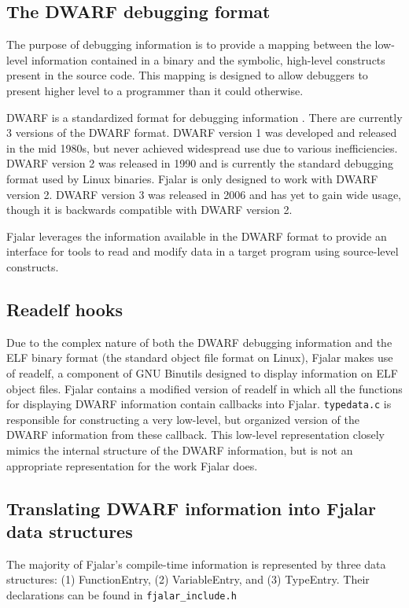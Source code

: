 \documentclass[11pt]{article}
\begin{document}
\subsection{The DWARF debugging format}
The purpose of debugging information is to provide a mapping between
the low-level information contained in a binary and the symbolic,
high-level constructs present in the source code. This mapping is
designed to allow debuggers to present higher level to a programmer
than it could otherwise.

DWARF is a standardized format for debugging information
\cite{silverstein1993dwarf}. There are currently 3 versions of the
DWARF format. DWARF version 1 was developed and released in the mid
1980s, but never achieved widespread use due to various inefficiencies. DWARF
version 2 was released in 1990 and is currently the standard debugging
format used by Linux binaries. Fjalar is only designed to work with
DWARF version 2. DWARF version 3 was released in 2006 and has yet to
gain wide usage, though it is backwards compatible with DWARF version 2.

Fjalar leverages the information available in the DWARF format to
provide an interface for tools to read and modify data in a target
program using source-level constructs.


\subsection{Readelf hooks}
Due to the complex nature of both the DWARF debugging information and
the ELF binary format (the standard object file format on Linux),
Fjalar makes use of readelf, a component of GNU Binutils designed to
display information on ELF object files. Fjalar contains a modified
version of readelf in which all the functions for displaying DWARF
information contain callbacks into Fjalar. \texttt{typedata.c} is
responsible for constructing a very low-level, but organized version
of the DWARF information from these callback. This low-level 
representation closely mimics the internal structure of the DWARF
information, but is not an appropriate representation for the work
Fjalar does.

\subsection{Translating DWARF information into Fjalar data structures}
The majority of Fjalar's compile-time information is represented by
three data structures: (1) FunctionEntry, (2) VariableEntry, and (3)
TypeEntry. Their declarations can be found in \texttt{fjalar\_include.h}
\end{document}

